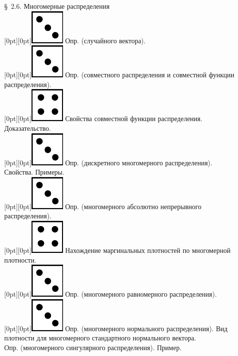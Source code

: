 \documentclass[10pt]{amsart}
\begin{document}
\begin{enumerate}
\begin{enumerate}
    
\item[\S\, 2.6.] Многомерные распределения \\
 \raisebox{-1pt}[0pt][0pt]{\includegraphics[width=0.02\linewidth]{3.png}} Опр. (случайного вектора). \\
 \raisebox{-1pt}[0pt][0pt]{\includegraphics[width=0.02\linewidth]{3.png}} Опр. (совместного распределения и  совместной функции распределения). \\
 \raisebox{-1pt}[0pt][0pt]{\includegraphics[width=0.02\linewidth]{4.png}} Свойства совместной функции распределения. Доказательство. \\
 \raisebox{-1pt}[0pt][0pt]{\includegraphics[width=0.02\linewidth]{3.png}} Опр. (дискретного многомерного распределения). Свойства. Примеры. \\
 \raisebox{-1pt}[0pt][0pt]{\includegraphics[width=0.02\linewidth]{3.png}} Опр. (многомерного абсолютно непрерывного распределения). \\
 \raisebox{-1pt}[0pt][0pt]{\includegraphics[width=0.02\linewidth]{4.png}} Нахождение маргинальных плотностей по многомерной плотности. \\
 \raisebox{-1pt}[0pt][0pt]{\includegraphics[width=0.02\linewidth]{3.png}} Опр. (многомерного равномерного распределения). \\
 \raisebox{-1pt}[0pt][0pt]{\includegraphics[width=0.02\linewidth]{3.png}} Опр. (многомерного нормального распределения). Вид плотности для многомерного стандартного нормального вектора. \\ 
Опр. (многомерного сингулярного распределения). Пример. \\

\end{enumerate}
\end{enumerate}
\end{document}
